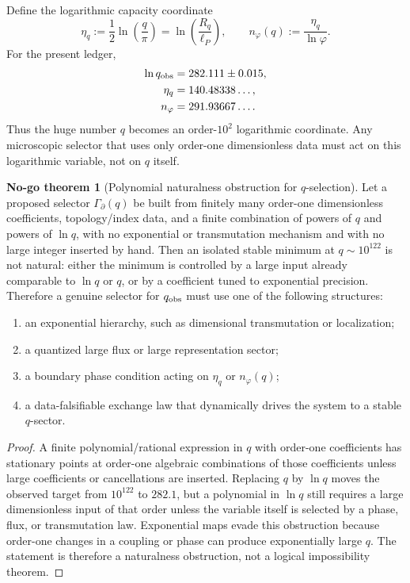 \documentclass[aps,prd,reprint,nofootinbib,superscriptaddress,floatfix]{revtex4-2}
\numberwithin{equation}{section}
\theoremstyle{definition}
\newtheorem{nogotheorem}{No-go theorem}[section]
\theoremstyle{plain}
\begin{document}
Define the logarithmic capacity coordinate
\begin{equation}
\eta_q:=\frac12\ln\!\left(\frac{q}{\pi}\right)
       =\ln\!\left(\frac{R_q}{\ell_P}\right),
\qquad
n_\varphi(q):=\frac{\eta_q}{\ln\varphi}.
\end{equation}
For the present ledger,
\begin{align}
\ln q_{\rm obs}&=282.111\pm0.015,\\
\eta_q&=140.48338\ldots,\\
n_\varphi&=291.93667\ldots .
\end{align}
Thus the huge number \(q\) becomes an order-\(10^2\) logarithmic
coordinate.  Any microscopic selector that uses only order-one
dimensionless data must act on this logarithmic variable, not on \(q\)
itself.

\begin{nogotheorem}[Polynomial naturalness obstruction for \(q\)-selection]
Let a proposed selector \(\Gamma_\partial(q)\) be built from finitely
many order-one dimensionless coefficients, topology/index data, and a
finite combination of powers of \(q\) and powers of \(\ln q\), with no
exponential or transmutation mechanism and with no large integer
inserted by hand.  Then an isolated stable minimum at
\(q\sim10^{122}\) is not natural: either the minimum is controlled by
a large input already comparable to \(\ln q\) or \(q\), or by a
coefficient tuned to exponential precision.  Therefore a genuine
selector for \(q_{\rm obs}\) must use one of the following structures:
\begin{enumerate}
\item an exponential hierarchy, such as dimensional transmutation or
localization;
\item a quantized large flux or large representation sector;
\item a boundary phase condition acting on \(\eta_q\) or
\(n_\varphi(q)\);
\item a data-falsifiable exchange law that dynamically drives the
system to a stable \(q\)-sector.
\end{enumerate}
\end{nogotheorem}

\begin{proof}
A finite polynomial/rational expression in \(q\) with order-one
coefficients has stationary points at order-one algebraic combinations
of those coefficients unless large coefficients or cancellations are
inserted.  Replacing \(q\) by \(\ln q\) moves the observed target from
\(10^{122}\) to \(282.1\), but a polynomial in \(\ln q\) still requires
a large dimensionless input of that order unless the variable itself is
selected by a phase, flux, or transmutation law.  Exponential maps
evade this obstruction because order-one changes in a coupling or phase
can produce exponentially large \(q\).  The statement is therefore a
naturalness obstruction, not a logical impossibility theorem.
\end{proof}
\end{document}
